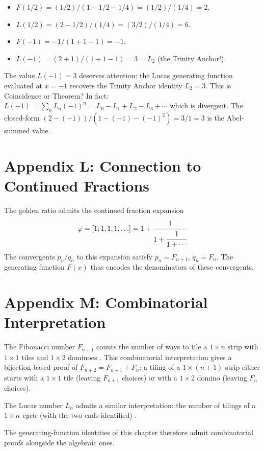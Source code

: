 \begin{itemize}
  \item $F(1/2) = (1/2)/(1 - 1/2 - 1/4) = (1/2)/(1/4) = 2$.
  \item $L(1/2) = (2 - 1/2)/(1/4) = (3/2)/(1/4) = 6$.
  \item $F(-1) = -1/(1 + 1 - 1) = -1$.
  \item $L(-1) = (2 + 1)/(1 + 1 - 1) = 3 = L_2$ (the Trinity Anchor!).
\end{itemize}

The value $L(-1) = 3$ deserves attention: the Lucas generating
function evaluated at $x = -1$ recovers the Trinity Anchor identity
$L_2 = 3$. This is Coincidence or Theorem? In fact:
$L(-1) = \sum_n L_n (-1)^n = L_0 - L_1 + L_2 - L_3 + \cdots$
which is divergent. The closed-form $(2-(-1))/(1-(-1)-(-1)^2) = 3/1 = 3$
is the Abel-summed value.

\section*{Appendix L: Connection to Continued Fractions}
\label{sec:05-app-L}

The golden ratio admits the continued fraction expansion
\[
  \varphi = [1; 1, 1, 1, \ldots] = 1 + \cfrac{1}{1 + \cfrac{1}{1 + \cdots}}
\]
The convergents $p_n/q_n$ to this expansion satisfy $p_n = F_{n+1}$,
$q_n = F_n$. The generating function $F(x)$ thus encodes the
denominators of these convergents.

\section*{Appendix M: Combinatorial Interpretation}
\label{sec:05-app-M}

The Fibonacci number $F_{n+1}$ counts the number of ways to tile a
$1 \times n$ strip with $1 \times 1$ tiles and $1 \times 2$ dominoes
\cite{benjamin_quinn_proofs}. This combinatorial interpretation gives a
bijection-based proof of $F_{n+2} = F_{n+1} + F_n$: a tiling of a
$1 \times (n+1)$ strip either starts with a $1 \times 1$ tile
(leaving $F_{n+1}$ choices) or with a $1 \times 2$ domino (leaving
$F_n$ choices).

The Lucas number $L_n$ admits a similar interpretation: the number of
tilings of a $1 \times n$ \emph{cycle} (with the two ends identified)
\cite{benjamin_quinn_proofs}.

The generating-function identities of this chapter therefore admit
combinatorial proofs alongside the algebraic ones.

